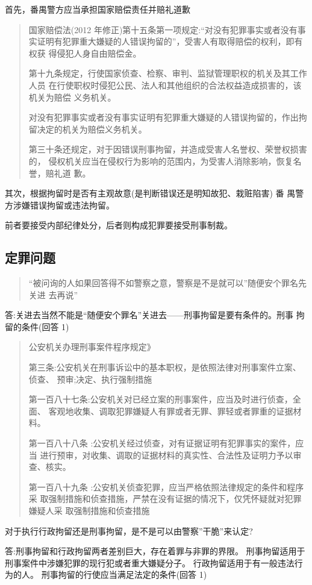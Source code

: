 \documentclass{ctexart}
\begin{document}
\medskip
首先，番禺警方应当承担国家赔偿责任并赔礼道歉\par
\begin{quotation}
国家赔偿法(2012 年修正)第十五条第一项规定:“对没有犯罪事实或者没有事 实证明有犯罪重大嫌疑的人错误拘留的”，受害人有取得赔偿的权利，即有权获 得侵犯人身自由赔偿金。\par

第十九条规定，行使国家侦查、检察、审判、监狱管理职权的机关及其工作人员 在行使职权时侵犯公民、法人和其他组织的合法权益造成损害的，该机关为赔偿 义务机关。\par
对没有犯罪事实或者没有事实证明有犯罪重大嫌疑的人错误拘留的，作出拘 留决定的机关为赔偿义务机关。\par
第三十条还规定，对于因错误刑事拘留，并造成受害人名誉权、荣誉权损害的， 侵权机关应当在侵权行为影响的范围内，为受害人消除影响，恢复名誉，赔礼道 歉。\par
\end{quotation}\par
其次，根据拘留时是否有主观故意(是判断错误还是明知故犯、栽赃陷害) 番 禺警方涉嫌错误拘留或违法拘留。\par
前者要接受内部纪律处分，后者则构成犯罪要接受刑事制裁。
\subsection{定罪问题}
\begin{quotation}
  “被问询的人如果回答得不如警察之意，警察是不是就可以”随便安个罪名先关进 去再说”
\end{quotation}\par
答:关进去当然不能是“随便安个罪名”关进去——刑事拘留是要有条件的。刑事 拘留的条件(回答 1)\par
\begin{quotation}
  公安机关办理刑事案件程序规定》\par 第三条:公安机关在刑事诉讼中的基本职权，是依照法律对刑事案件立案、侦查、 预审;决定、执行强制措施\par
  第一百八十七条:公安机关对已经立案的刑事案件，应当及时进行侦查，全面、 客观地收集、调取犯罪嫌疑人有罪或者无罪、罪轻或者罪重的证据材料。\par  第一百八十八条 :公安机关经过侦查，对有证据证明有犯罪事实的案件，应当 进行预审，对收集、调取的证据材料的真实性、合法性及证明力予以审查、核实。\par  第一百八十九条 :公安机关侦查犯罪，应当严格依照法律规定的条件和程序采 取强制措施和侦查措施，严禁在没有证据的情况下，仅凭怀疑就对犯罪嫌疑人采 取强制措施和侦查措施\par
\end{quotation}\par
对于执行行政拘留还是刑事拘留，是不是可以由警察”干脆”来认定?\par
答:刑事拘留和行政拘留两者差别巨大，存在着罪与非罪的界限。 刑事拘留适用于刑事案件中涉嫌犯罪的现行犯或者重大嫌疑分子。
行政拘留适用于有一般违法行为的人。 刑事拘留的行使应当满足法定的条件(回答 1)
\end{document}
